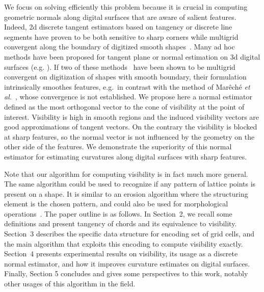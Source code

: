 \documentclass[runningheads]{llncs}
\begin{document}
    We focus on solving efficiently this problem because it is crucial
    in computing geometric normals along digital surfaces that are
    aware of salient features. Indeed, 2d discrete tangent estimators
    based on tangency or discrete line segments have proven to be both
    sensitive to sharp corners while multigrid convergent along the
    boundary of digitized smooth shapes~\cite{feschet:1999-dgci,lachaud:2007-ivc,nguyen:2011-pr}.
    Many ad hoc methods have been proposed for tangent plane or normal
    estimation on 3d digital surfaces
    (e.g. \cite{fourey:2009-cg,charrier:2011-iwcia,Cuel:2014-dgci,Lachaud:2017-lnm,mareche:2024-ispr}).
    If two of these methods~\cite{Cuel:2014-dgci,Lachaud:2017-lnm}
    have been shown to be multigrid convergent on digitization of
    shapes with smooth boundary, their formulation intrinsically
    smoothes features, e.g.\ in contrast with the method of
    Mar{ê}ch{é} \emph{et al.}~\cite{mareche:2024-ispr}, whose
    convergence is not established. We propose here a normal estimator
    defined as the most orthogonal vector to the cone of visibility at
    the point of interest. Visibility is high in smooth regions and
    the induced visibility vectors are good approximations of tangent
    vectors. On the contrary the visibility is blocked at sharp
    features, so the normal vector is not influenced by the
    geometry on the other side of the features. We demonstrate the
    superiority of this normal estimator for estimating curvatures
    along digital surfaces with sharp features.

    Note that our algorithm for computing visibility is in fact much
    more general. The same algorithm could be used to recognize if any
    pattern of lattice points is present on a shape. It is similar to
    an erosion algorithm where the structuring element is the chosen
    pattern, and could also be used for morphological operations~\cite{soille1999morphological}.
    The paper outline is as follows. In Section~2, we recall some
    definitions and present tangency of chords and its equivalence
    to visibility. Section~3 describes the specific data structure
    for encoding set of grid cells, and the main algorithm that
    exploits this encoding to compute visibility exactly. Section~4
    presents experimental results on visibility, its usage as a
    discrete normal estimator, and how it improves curvature estimates
    on digital surfaces. Finally, Section 5 concludes and gives some
    perspectives to this work, notably other usages of this algorithm
    in the field.
\end{document}
